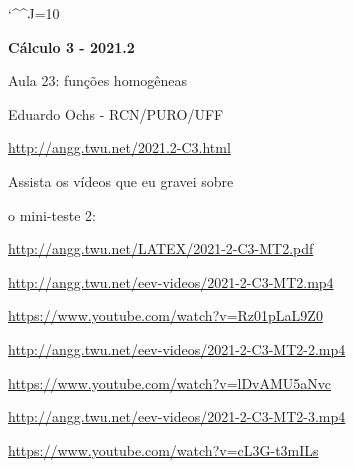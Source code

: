 \documentclass[oneside,12pt]{article}
\begin{document}
\catcode`\^^J=10
%
\pu
\def\pictgridstyle{\color{GrayPale}\linethickness{0.3pt}}
\def\pictaxesstyle{\linethickness{0.5pt}}




\def\u#1{\par{\footnotesize \url{#1}}}

\def\drafturl{http://angg.twu.net/LATEX/2021-2-C3.pdf}
\def\drafturl{http://angg.twu.net/2021.2-C3.html}
\def\draftfooter{\tiny \href{\drafturl}{\jobname{}} \ColorBrown{\shorttoday{} \hours}}



%

\thispagestyle{empty}

\begin{center}

\vspace*{1.2cm}

{\bf \Large Cálculo 3 - 2021.2}

\bsk

Aula 23: funções homogêneas

\bsk

Eduardo Ochs - RCN/PURO/UFF

\url{http://angg.twu.net/2021.2-C3.html}

\end{center}

\newpage

Assista os vídeos que eu gravei sobre

o mini-teste 2:

\msk


{\footnotesize

\url{http://angg.twu.net/LATEX/2021-2-C3-MT2.pdf}

\msk

\url{http://angg.twu.net/eev-videos/2021-2-C3-MT2.mp4}

\url{https://www.youtube.com/watch?v=Rz01pLaL9Z0}

\ssk

\url{http://angg.twu.net/eev-videos/2021-2-C3-MT2-2.mp4}

\url{https://www.youtube.com/watch?v=lDvAMU5aNvc}

\ssk

\url{http://angg.twu.net/eev-videos/2021-2-C3-MT2-3.mp4}

\url{https://www.youtube.com/watch?v=cL3G-t3mILs}


}
\end{document}
